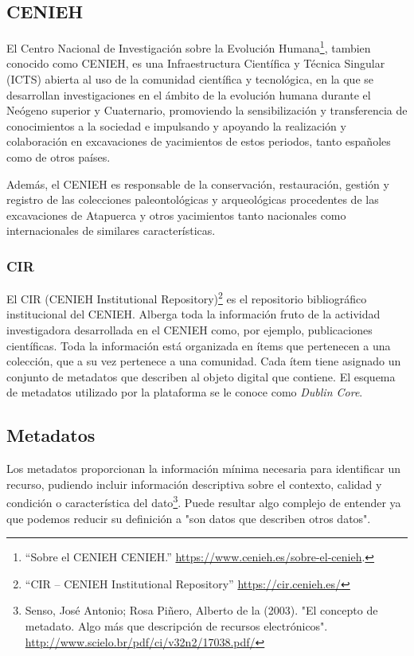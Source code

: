 \documentclass[
]{article}
\begin{document}
\hypertarget{cenieh}{%
\subsection{CENIEH}\label{cenieh}}

El Centro Nacional de Investigación sobre la Evolución
Humana\footnote{``Sobre el CENIEH \textbar{} CENIEH.''
  \url{https://www.cenieh.es/sobre-el-cenieh}.}, tambien conocido como
CENIEH, es una Infraestructura Científica y Técnica Singular (ICTS)
abierta al uso de la comunidad científica y tecnológica, en la que se
desarrollan investigaciones en el ámbito de la evolución humana durante
el Neógeno superior y Cuaternario, promoviendo la sensibilización y
transferencia de conocimientos a la sociedad e impulsando y apoyando la
realización y colaboración en excavaciones de yacimientos de estos
periodos, tanto españoles como de otros países.

Además, el CENIEH es responsable de la conservación, restauración,
gestión y registro de las colecciones paleontológicas y arqueológicas
procedentes de las excavaciones de Atapuerca y otros yacimientos tanto
nacionales como internacionales de similares características.

\hypertarget{cir}{%
\subsubsection{CIR}\label{cir}}

El CIR (CENIEH Institutional Repository)\footnote{``CIR -- CENIEH
  Institutional Repository'' \url{https://cir.cenieh.es/}} es el
repositorio bibliográfico institucional del CENIEH. Alberga toda la
información fruto de la actividad investigadora desarrollada en el
CENIEH como, por ejemplo, publicaciones científicas. Toda la información
está organizada en ítems que pertenecen a una colección, que a su vez
pertenece a una comunidad. Cada ítem tiene asignado un conjunto de
metadatos que describen al objeto digital que contiene. El esquema de
metadatos utilizado por la plataforma se le conoce como \emph{Dublin
Core}.

\hypertarget{metadatos}{%
\subsection{Metadatos}\label{metadatos}}

Los metadatos proporcionan la información mínima necesaria para
identificar un recurso, pudiendo incluir información descriptiva sobre
el contexto, calidad y condición o característica del dato\footnote{Senso,
  José Antonio; Rosa Piñero, Alberto de la (2003). "El concepto de
  metadato. Algo más que descripción de recursos electrónicos".
  \url{http://www.scielo.br/pdf/ci/v32n2/17038.pdf/}}. Puede resultar
algo complejo de entender ya que podemos reducir su definición a "son
datos que describen otros datos".
\end{document}
